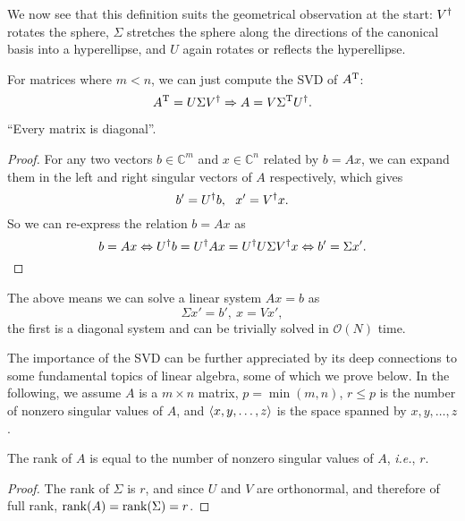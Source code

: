 \documentclass{article}
\begin{document}
We now see that this definition suits the geometrical observation at the start: $V^{\dagger}$ rotates the sphere, $\Sigma$ stretches the sphere along the directions of the canonical basis into a hyperellipse, and $U$ again rotates or reflects the hyperellipse.

For matrices where $m<n$, we can just compute the SVD of $A^{\text{T}}$:
\begin{equation}
    A^{\text{T}}=U\Sigma V^{\dagger}\Rightarrow A=V\Sigma^{\text{T}} U^{\dagger}.
\end{equation}

\begin{corollary}
    ``Every matrix is diagonal''.
\end{corollary}
\begin{proof}
    For any two vectors $b\in\mathbb{C}^m$ and $x\in\mathbb{C}^n$ related by $b=Ax$, we can expand them in the left and right singular vectors of $A$ respectively, which gives
    \begin{equation}
        b'=U\adj b,\ \ x'=V\adj x.
    \end{equation}
    So we can re-express the relation $b=Ax$ as
    \begin{equation}
    b=Ax \Leftrightarrow U^{\dagger} b=U^{\dagger} Ax=U^{\dagger} U\Sigma V^{\dagger} x \Leftrightarrow b'=\Sigma x'.
    \end{equation}
\end{proof}
The above means we can solve a linear system $Ax=b$ as
\begin{equation}
    \Sigma x'=b',\ x=Vx',
\end{equation}
the first is a diagonal system and can be trivially solved in $\mathcal{O}(N)$ time.

The importance of the SVD can be further appreciated by its deep connections to some fundamental topics of linear algebra, some of which we prove below. In the following, we assume $A$ is a $m\times n$ matrix, $p=\min(m,n)$, $r\leq p$ is the number of nonzero singular values of $A$, and $\langle x,y,\dots,z\rangle$ is the space spanned by $x,y,\dots,z$.

\begin{theorem}
    The rank of $A$ is equal to the number of nonzero singular values of $A$, \textit{i.e.}, $r$.
\end{theorem}
\begin{proof}
    The rank of $\Sigma$ is $r$, and since $U$ and $V$ are orthonormal, and therefore of full rank, $\operatorname{rank}(A)=\operatorname{rank}(\Sigma)=r$.
\end{proof}
\end{document}
